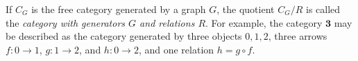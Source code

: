 If $C_G$ is the free category generated by a graph $G$, the quotient $C_G/R$ is called the \emph{category with generators $G$ and relations $R$}. For example, the category $\mathbf{3}$ may be described as the category generated by three objects $0, 1, 2$, three arrows $f: 0 \to 1$, $g: 1 \to 2$, and $h: 0 \to 2$, and one relation $h = g \circ f$.
